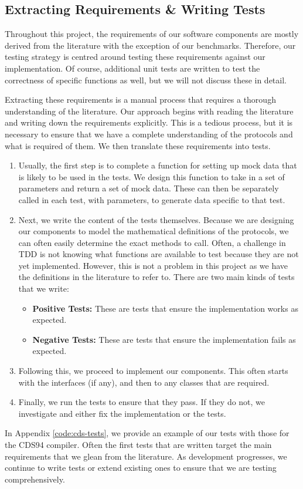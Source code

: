 \subsection{Extracting Requirements \& Writing Tests}
Throughout this project, the requirements of our software components are mostly derived 
from the literature with the exception of our benchmarks. Therefore, our testing 
strategy is centred around testing these requirements against our implementation. Of 
course, additional unit tests are written to test the correctness of specific functions
as well, but we will not discuss these in detail. 

Extracting these requirements is a manual process that requires a thorough 
understanding of the literature. Our approach begins with reading the literature and
writing down the requirements explicitly. This is a tedious process,
but it is necessary to ensure that we have a complete understanding of the protocols
and what is required of them. We then translate these requirements into tests. 
\begin{enumerate}
  \item Usually, the first step is to complete a function for setting up mock data 
  that is likely to be used in the tests. We design this function to take in a set of 
  parameters and return a set of mock data. These can then be separately called in 
  each test, with parameters, to generate data specific to that test. 
  \item Next, we write the content of the tests themselves. Because we are designing our 
  components to model the mathematical definitions of the protocols, we can often easily 
  determine the exact methods to call. Often, a 
  challenge in TDD is not knowing what functions are available to test because they 
  are not yet implemented. However, this is not a problem in this project as we have 
  the definitions in the literature to refer to. There are two main kinds of tests 
  that we write:
  \begin{itemize}
    \item \textbf{Positive Tests:} These are tests that ensure the implementation
    works as expected. 
    \item \textbf{Negative Tests:} These are tests that ensure the implementation
    fails as expected.
  \end{itemize}
  \item Following this, we proceed to implement our components. This often starts with 
  the interfaces (if any), and then to any classes that are required. 
  \item Finally, we run the tests to ensure that they pass. If they do not, we 
  investigate and either fix the implementation or the tests.
\end{enumerate}

In Appendix \ref{code:cds-tests}, we provide an example of our tests with those 
for the CDS94 compiler. Often the first tests that are written target the main 
requirements that we glean from the literature. As development progresses, we 
continue to write tests or extend existing ones to ensure that we are testing 
comprehensively. 
